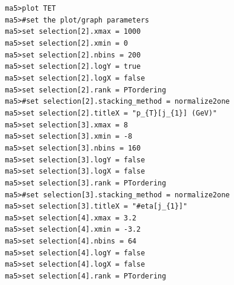 \documentclass[a4paper, 10pt]{article}
\begin{document}
\texttt{ }\texttt{ }\texttt{ma5>plot TET\\
}
\texttt{ }\texttt{ }\texttt{ma5>\#set the plot/\-graph parameters\\
}
\texttt{ }\texttt{ }\texttt{ma5>set selection[2].xmax = 1000\\
}
\texttt{ }\texttt{ }\texttt{ma5>set selection[2].xmin = 0\\
}
\texttt{ }\texttt{ }\texttt{ma5>set selection[2].nbins = 200\\
}
\texttt{ }\texttt{ }\texttt{ma5>set selection[2].logY = true\\
}
\texttt{ }\texttt{ }\texttt{ma5>set selection[2].logX = false\\
}
\texttt{ }\texttt{ }\texttt{ma5>set selection[2].rank = PTordering\\
}
\texttt{ }\texttt{ }\texttt{ma5>\#set selection[2].stacking\_method = normalize2one\\
}
\texttt{ }\texttt{ }\texttt{ma5>set selection[2].titleX = "p\_\{T\}[j\_\{1\}] (GeV)"\\
}
\texttt{ }\texttt{ }\texttt{ma5>set selection[3].xmax = 8\\
}
\texttt{ }\texttt{ }\texttt{ma5>set selection[3].xmin = -8\\
}
\texttt{ }\texttt{ }\texttt{ma5>set selection[3].nbins = 160\\
}
\texttt{ }\texttt{ }\texttt{ma5>set selection[3].logY = false\\
}
\texttt{ }\texttt{ }\texttt{ma5>set selection[3].logX = false\\
}
\texttt{ }\texttt{ }\texttt{ma5>set selection[3].rank = PTordering\\
}
\texttt{ }\texttt{ }\texttt{ma5>\#set selection[3].stacking\_method = normalize2one\\
}
\texttt{ }\texttt{ }\texttt{ma5>set selection[3].titleX = "\#eta[j\_\{1\}]"\\
}
\texttt{ }\texttt{ }\texttt{ma5>set selection[4].xmax = 3.2\\
}
\texttt{ }\texttt{ }\texttt{ma5>set selection[4].xmin = -3.2\\
}
\texttt{ }\texttt{ }\texttt{ma5>set selection[4].nbins = 64\\
}
\texttt{ }\texttt{ }\texttt{ma5>set selection[4].logY = false\\
}
\texttt{ }\texttt{ }\texttt{ma5>set selection[4].logX = false\\
}
\texttt{ }\texttt{ }\texttt{ma5>set selection[4].rank = PTordering\\
}
\end{document}
